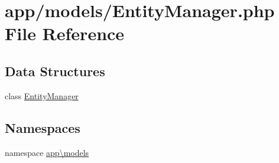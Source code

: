 \hypertarget{_entity_manager_8php}{\section{app/models/\-Entity\-Manager.php File Reference}
\label{_entity_manager_8php}
}
\subsection*{Data Structures}
\begin{DoxyCompactItemize}
\item 
class \hyperlink{classapp_1_1models_1_1_entity_manager}{Entity\-Manager}
\end{DoxyCompactItemize}
\subsection*{Namespaces}
\begin{DoxyCompactItemize}
\item 
namespace \hyperlink{namespaceapp_1_1models}{app\textbackslash{}models}
\end{DoxyCompactItemize}
